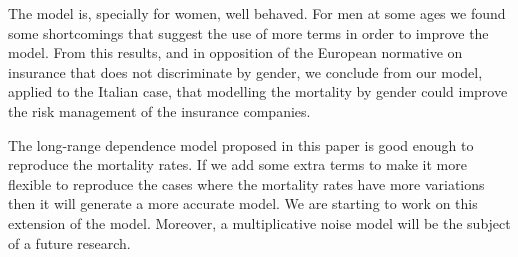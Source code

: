 \documentclass[smallextended]{svjour3}
\begin{document}
	The model is, specially for women, well behaved. For men at some ages we found
some shortcomings that suggest the use of more terms in order to improve the model. 
From this results, and in opposition of the European normative on insurance 
that does not discriminate by gender, we conclude from our model, applied 
to the Italian case, that modelling the mortality by gender could improve 
the risk management of the insurance companies.


	The long-range dependence model proposed in this paper is good
enough to reproduce the mortality rates. If we add some extra terms to make it
more flexible to reproduce the cases where the mortality rates have more
variations then it will generate a more accurate model. We are starting to work
on this extension of the model. Moreover, a multiplicative noise model will be
the subject of a future research.

{}
%









\end{document}

